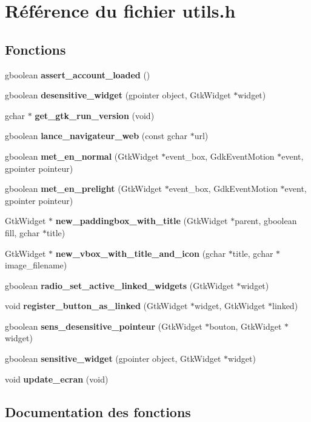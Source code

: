 \section{Référence du fichier utils.h}
\label{utils_8h}
\subsection*{Fonctions}
\begin{DoxyCompactItemize}
\item 
gboolean {\bf assert\_\-account\_\-loaded} ()
\item 
gboolean {\bf desensitive\_\-widget} (gpointer object, GtkWidget $\ast$widget)
\item 
gchar $\ast$ {\bf get\_\-gtk\_\-run\_\-version} (void)
\item 
gboolean {\bf lance\_\-navigateur\_\-web} (const gchar $\ast$url)
\item 
gboolean {\bf met\_\-en\_\-normal} (GtkWidget $\ast$event\_\-box, GdkEventMotion $\ast$event, gpointer pointeur)
\item 
gboolean {\bf met\_\-en\_\-prelight} (GtkWidget $\ast$event\_\-box, GdkEventMotion $\ast$event, gpointer pointeur)
\item 
GtkWidget $\ast$ {\bf new\_\-paddingbox\_\-with\_\-title} (GtkWidget $\ast$parent, gboolean fill, gchar $\ast$title)
\item 
GtkWidget $\ast$ {\bf new\_\-vbox\_\-with\_\-title\_\-and\_\-icon} (gchar $\ast$title, gchar $\ast$image\_\-filename)
\item 
gboolean {\bf radio\_\-set\_\-active\_\-linked\_\-widgets} (GtkWidget $\ast$widget)
\item 
void {\bf register\_\-button\_\-as\_\-linked} (GtkWidget $\ast$widget, GtkWidget $\ast$linked)
\item 
gboolean {\bf sens\_\-desensitive\_\-pointeur} (GtkWidget $\ast$bouton, GtkWidget $\ast$widget)
\item 
gboolean {\bf sensitive\_\-widget} (gpointer object, GtkWidget $\ast$widget)
\item 
void {\bf update\_\-ecran} (void)
\end{DoxyCompactItemize}


\subsection{Documentation des fonctions}
